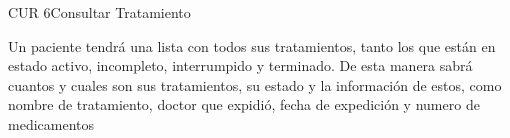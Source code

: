 \begin{UseCase}{CUR 6}{Consultar Tratamiento}
    {
    	
    	Un paciente tendrá una lista con todos sus tratamientos, tanto los que están en estado activo, incompleto, interrumpido y terminado. De esta manera sabrá cuantos y cuales son sus tratamientos, su estado y la información de estos, como nombre de tratamiento, doctor que expidió, fecha de expedición y numero de medicamentos
    	
    	
    }


\end{UseCase}
